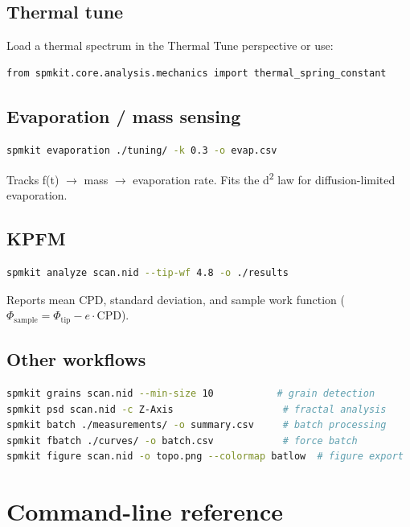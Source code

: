 \documentclass[a4paper,11pt]{article}
\begin{document}
\subsection{Thermal tune}
Load a thermal spectrum in the Thermal Tune perspective or use:
\begin{lstlisting}[language=bash]
from spmkit.core.analysis.mechanics import thermal_spring_constant
\end{lstlisting}

\subsection{Evaporation / mass sensing}
\begin{lstlisting}[language=bash]
spmkit evaporation ./tuning/ -k 0.3 -o evap.csv
\end{lstlisting}

Tracks f(t) $\rightarrow$ mass $\rightarrow$ evaporation rate. Fits the d\textsuperscript{2} law for diffusion-limited evaporation.

\subsection{KPFM}
\begin{lstlisting}[language=bash]
spmkit analyze scan.nid --tip-wf 4.8 -o ./results
\end{lstlisting}

Reports mean CPD, standard deviation, and sample work function
($\Phi_{\text{sample}} = \Phi_{\text{tip}} - e\cdot\text{CPD}$).

\subsection{Other workflows}
\begin{lstlisting}[language=bash]
spmkit grains scan.nid --min-size 10           # grain detection
spmkit psd scan.nid -c Z-Axis                   # fractal analysis
spmkit batch ./measurements/ -o summary.csv     # batch processing
spmkit fbatch ./curves/ -o batch.csv            # force batch
spmkit figure scan.nid -o topo.png --colormap batlow  # figure export
\end{lstlisting}

\section{Command-line reference}
\end{document}
